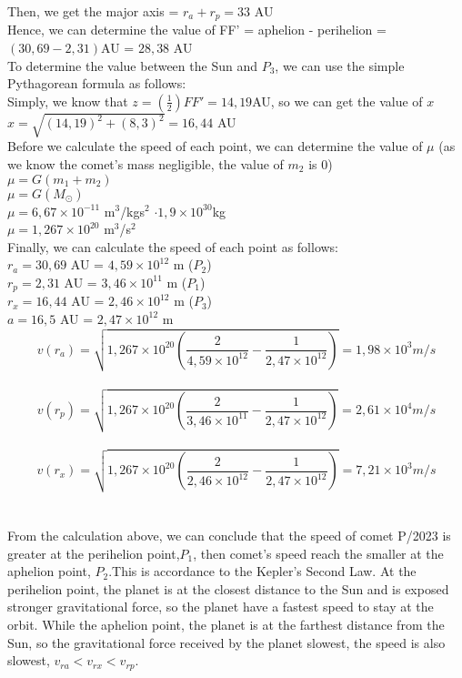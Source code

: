 \documentclass[12pt,times new roman, 2pt, a4paper]{report}
\begin{document}
Then, we get the major axis = ${r}_{a}+{r}_{p}= 33$ AU\\
Hence, we can determine the value of FF' = aphelion - perihelion = $(30,69-2,31)$AU = $28,38$ AU\\
To determine the value between the Sun and ${P}_{3}$, we can use the simple Pythagorean formula as follows:\\
Simply, we know that $ z = \left(\frac{1}{2}\right)FF' = 14,19$\hspace{0.1in}AU, so we can get the value of $x$\\
$x = \sqrt{(14,19)^{2}+(8,3)^{2}} = 16,44$ AU\\
Before we calculate the speed of each point, we can determine the value of $\mu$ (as we know the comet's mass negligible, the value of ${m}_{2}$ is 0)\\
$\mu =G({m}_{1}+{m}_{2})$\\
$\mu =G(M_{\odot})$\\
$\mu = 6,67 \times 10^{-11}$ m$^{3}$/kgs$^{2}$ $\cdot 1,9 \times 10^{30}$kg \\
$\mu = 1,267 \times 10^{20}$ m$^{3}$/s$^{2}$ \\ 
Finally, we can calculate the speed of each point as follows:\\
${r}_{a} = 30,69$ AU = $4,59 \times {10}^{12}$ m (${P}_{2}$)\\
${r}_{p} = 2,31$ AU = $3,46 \times {10}^{11}$ m (${P}_{1}$)\\
${r}_{x} = 16,44$ AU = $2,46 \times {10}^{12}$ m (${P}_{3}$)\\
$a = 16,5$ AU = $2,47 \times {10}^{12}$ m\\
$$v({r}_{a})=\sqrt {1,267 \times 10^{20} \left(\frac {2} {4,59 \times {10}^{12}}- \frac {1} {2,47 \times {10}^{12}}\right)} =1,98\times 10^{3} m/s $$\\
$$v({r}_{p})=\sqrt {1,267 \times 10^{20} \left(\frac {2} {3,46 \times {10}^{11}}- \frac {1} {2,47 \times {10}^{12}}\right)} =2,61\times 10^{4} m/s $$\\
$$v({r}_{x})=\sqrt {1,267 \times 10^{20} \left(\frac {2} {2,46 \times {10}^{12}}- \frac {1} {2,47 \times {10}^{12}}\right)} =7,21\times 10^{3} m/s $$\\\\
From the calculation above, we can conclude that the speed of comet P/2023 is greater at the perihelion point,${P}_{1}$, then comet's speed reach the smaller at the aphelion point, ${P}_{2}$.This is accordance to the Kepler's Second Law. At the perihelion point, the planet is at the closest distance to the Sun and is exposed stronger gravitational force, so the planet have a fastest speed to stay at the orbit. While the aphelion point, the planet is at the farthest distance from the Sun, so the gravitational force received by the planet slowest, the speed is also slowest, ${v}_{ra}<{v}_{rx}<{v}_{rp}$.
\end{document}
